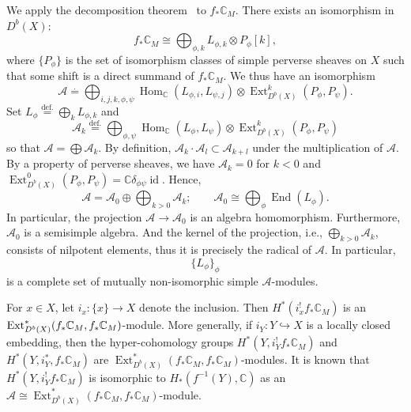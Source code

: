 \documentclass[12pt]{amsart}
\def\Bbb{\mathbb}
\theoremstyle{definition}
\theoremstyle{remark}
\numberwithin{equation}{subsection}
\newcommand{\defeq}{\overset{\operatorname{\scriptstyle def.}}{=}}
\newcommand{\C}{{\Bbb C}}
\newcommand{\End}{\operatorname{End}}
\newcommand{\Hom}{\operatorname{Hom}}
\newcommand{\Ext}{\operatorname{Ext}}
\newcommand{\ngpiso}{\overset{.}{=}}
\begin{document}
We apply the decomposition theorem~\cite{BBD} to $f_*\C_M$.
There exists an isomorphism in $D^b(X)$:
\begin{equation}\label{eq:decomp}
   f_*\C_M \cong \bigoplus_{\phi,k} L_{\phi,k}\otimes P_\phi[k],
\end{equation}
where $\{ P_\phi\}$ is the set of isomorphism classes of simple
perverse sheaves on $X$ such that some shift is a direct summand of
$f_*\C_M$. We thus have an isomorphism
\begin{equation*}
   \mathcal A \ngpiso
   \bigoplus_{i,j,k,\phi,\psi}
   \Hom_\C(L_{\phi,i}, L_{\psi,j})\otimes \Ext^k_{D^b(X)}(P_\phi, P_\psi).
\end{equation*}
Set $L_\phi\defeq \bigoplus_k L_{\phi,k}$ and
\begin{equation*}
   \mathcal A_k \defeq
   \bigoplus_{\phi,\psi}
   \Hom_\C(L_{\phi}, L_{\psi})\otimes \Ext^k_{D^b(X)}(P_\phi, P_\psi)
\end{equation*}
so that $\mathcal A = \bigoplus \mathcal A_k$. By definition,
$\mathcal A_k \cdot \mathcal A_l \subset \mathcal A_{k+l}$ under the
multiplication of $\mathcal A$.
By a property of perverse sheaves, we have
$\mathcal A_k = 0$ for $k < 0$
and $\Ext^0_{D^b(X)}(P_\phi, P_\psi) =
\C\delta_{\phi\psi}\operatorname{id}$.
Hence,
\begin{equation}\label{eq:convalg}
   \mathcal A = \mathcal A_0 \oplus \bigoplus_{k > 0} \mathcal A_k;
   \qquad
   \mathcal A_0 \cong \bigoplus_\phi \End(L_{\phi}).
\end{equation}
In particular, the projection $\mathcal A\to \mathcal A_0$ is an
algebra homomorphism.
Furthermore, $\mathcal A_0$ is a semisimple algebra.
And the kernel of the projection, i.e., $\bigoplus_{k > 0}\mathcal A_k$,
consists of nilpotent elements, thus it
is precisely the radical of $\mathcal A$.
In particular,
\begin{equation*}
   \{ L_\phi \}_{\phi}
\end{equation*}
is a complete set of mutually non-isomorphic simple
$\mathcal A$-modules.

For $x\in X$, let $i_x\colon \{x\} \to X$ denote the inclusion. Then
$H^*(i_x^! f_*\C_M)$ is an $\Ext^*_{D^b(X)}(f_*\C_M, \linebreak[3]
f_*\C_M)$-module.
More generally, if $i_Y\colon Y\hookrightarrow X$ is a locally closed
embedding, then the hyper-cohomology groups $H^*(Y,i_Y^! f_*\C_M)$ and
$H^*(Y,i_Y^*, f_*\C_M)$ are $\Ext^*_{D^b(X)}(f_*\C_M, f_*\C_M)$-modules.
It is known \cite[8.6.16, 8.6.35]{Gi-book} that $H^*(Y, i_Y^! f_*\C_M)$
is isomorphic to $H_*(f^{-1}(Y),\C)$ as an $\mathcal A \cong
\Ext^*_{D^b(X)}(f_*\C_M, f_*\C_M)$-module.
\end{document}
